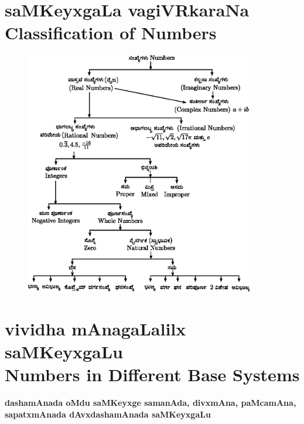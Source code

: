 \vfill
\eject

\section*{saMKeyxgaLa vagiVRkaraNa \\{\rm\bfseries Classification of Numbers}}
\begin{figure}[h]
\begin{center}
\includegraphics[width=10cm]{src/figure/165.eps}
\end{center}
\end{figure}

\vfill
\eject
\section*{vividha mAnagaLalilx saMKeyxgaLu\\{\rm\bfseries Numbers in Different Base Systems}}

\textbf{dashamAnada oMdu saMKeyxge samanAda, divxmAna, paMcamAna, sapatxmAnada dAvxdashamAnada saMKeyxgaLu}

